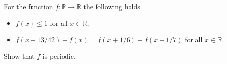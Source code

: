 For the function $f\colon\mathbb{R} \rightarrow \mathbb{R}$ the following holds
\begin{itemize}
    \item $f(x)\leq 1$ for all $x \in \mathbb{R}$,
    \item $f(x+13/42)+f(x)=f(x+1/6)+f(x+1/7)$ for all $x \in \mathbb{R}$.
\end{itemize}
Show that $f$ is periodic.
